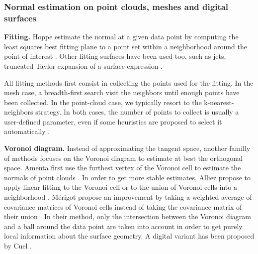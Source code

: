 
\subsubsection{Normal estimation on point clouds, meshes and digital surfaces}

\noindent\textbf{Fitting.}
Hoppe \etal estimate the normal at a given data point by computing
the least squares best fitting plane to a point set within a neighborhood
around the point of interest \cite{Hoppe1992}.
Other fitting surfaces have been used too, such as jets, \ie truncated Taylor expansion
of a surface expression \cite{Cazals2005,Cazals2008}. 

All fitting methods first consist in collecting the points used for the fitting.
In the mesh case, a breadth-first search visit the neighbors until enough points
have been collected. In the point-cloud case, we typically resort to the k-nearest-neighbors
strategy. In both cases, the number of points to collect is usually a user-defined parameter,
even if some heuristics are proposed to select it automatically \cite{Hoppe1992,Cazals2005}.  



\noindent\textbf{Voronoi diagram.}
Instead of approximating the tangent space, another familly of methods focuses on the
Voronoi diagram to estimate at best the orthogonal space. Amenta \etal first use the
furthest vertex of the Voronoi cell to estimate the normals of point clouds \cite{Amenta1999}.
In order to get more stable estimates, Alliez \etal propose to apply linear fitting
to the Voronoi cell or to the union of Voronoi cells into a neighborhood \cite{Alliez2007}. 
M\'{e}rigot \etal propose an improvement %
by taking a weighted average of covariance matrices of Voronoi cells instead of
taking the covariance matrix of their union \cite{Merigot2011}. In their method,
only the intersection between the Voronoi diagram and a ball around the data point
are taken into account in order to get purely local information about the surface geometry.
A digital variant has been proposed by Cuel \etal \cite{Cuel2015}. 

